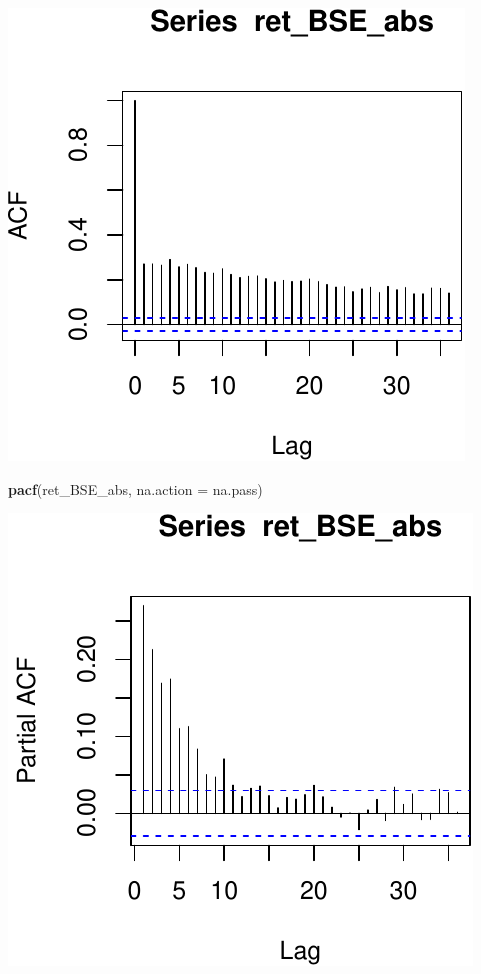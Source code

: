 \documentclass[11pt,]{article}
\newenvironment{Shaded}{\begin{snugshade}}{\end{snugshade}}
\newcommand{\KeywordTok}[1]{\textcolor[rgb]{0.13,0.29,0.53}{\textbf{#1}}}
\newcommand{\DataTypeTok}[1]{\textcolor[rgb]{0.13,0.29,0.53}{#1}}
\newcommand{\NormalTok}[1]{#1}
\begin{document}
\begin{center}\includegraphics{FMC_T4_PhD_ARMA_GARCH_files/figure-latex/BSE_ret_ACF_sq-3} \end{center}

\begin{Shaded}
\begin{Highlighting}[]
\KeywordTok{pacf}\NormalTok{(ret_BSE_abs, }\DataTypeTok{na.action =}\NormalTok{ na.pass)}
\end{Highlighting}
\end{Shaded}

\begin{center}\includegraphics{FMC_T4_PhD_ARMA_GARCH_files/figure-latex/BSE_ret_ACF_sq-4} \end{center}
\end{document}
